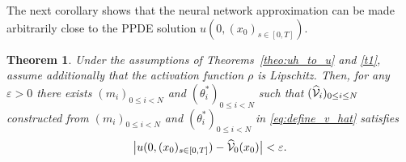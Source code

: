 \documentclass[12pt]{article}
\newtheorem{theorem}[prop]{Theorem}
\numberwithin{equation}{section}
\begin{document}
The next corollary shows that the neural network approximation
can be made arbitrarily close to the PPDE solution $u\left(0, (x_0)_{s \in [0,T]}\right)$.
\begin{theorem}
    \label{corollary_convergence}
  Under the assumptions of Theorems~\ref{theo:uh_to_u} and \ref{t1},
  assume additionally that the activation function
  $\rho$ is Lipschitz.
  Then, for any $\varepsilon >0$ there exists
  $(m_i)_{0 \leq i < N }$
  and $(\theta_i^*)_{0 \leq i < N }$ such that
  $(\widehat{\cal V}_i)_{0 \leq i \leq N}$ constructed from
  $(m_i)_{0 \leq i < N }$ and $(\theta_i^*)_{0 \leq i < N }$
  in \eqref{eq:define_v_hat} satisfies
\begin{equation*}
	\big\lvert u (0, (x_0)_{s \in [0,T]} )
                - \widehat{\cal V}_{0}(x_0)\big\rvert < \varepsilon.
\end{equation*}
\end{theorem}
\end{document}
